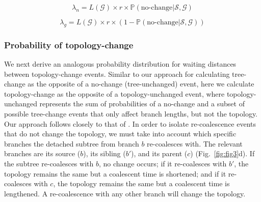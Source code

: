 \documentclass[11pt]{article}
\begin{document}
\begin{equation}
	\lambda_{n} = 
	L(\mathcal{G}) \times r \times 
	\mathbb{P}(\text{no-change} | \mathcal{S},\mathcal{G})
\end{equation}


\begin{equation}
	\lambda_{g} = 
	L(\mathcal{G}) \times r \times 
	(1 - \mathbb{P}(\text{no-change} | \mathcal{S},\mathcal{G}))
\end{equation}



\subsubsection{Probability of topology-change}

We next derive an analogous probability distribution for waiting distances 
between topology-change events.
Similar to our approach for calculating tree-change as the opposite of a 
no-change (tree-unchanged) event, here we calculate topology-change as the 
opposite of a topology-unchanged event, where topology-unchanged represents the 
sum of probabilities of a no-change and a subset of possible tree-change events 
that only affect branch lengths, but not the topology. 
Our approach follows closely to that of \citet{deng_distribution_2021}.
In order to isolate re-coalescence events that do not change the topology,
we must take into account which specific branches the detached subtree from 
branch $b$ re-coalesces with. The relevant branches are its source ($b$), 
its sibling ($b'$), and its parent ($c$) (Fig.~\ref{fig:fig3}d). 
If the subtree re-coalesces with $b$, no change occurs; if it re-coalesces
with $b'$, the topology remains the same but a coalescent time is shortened;
and if it re-coalesces with $c$, the topology remains the same but a coalescent 
time is lengthened. A re-coalescence with any other branch will change the topology.
\end{document}
